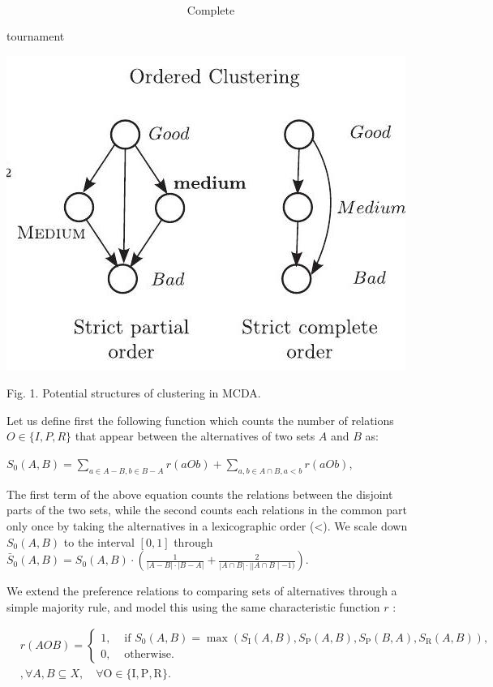 \documentclass[10pt]{article}
\begin{document}
$$
\text { Complete }
$$

tournament

\begin{center}
\includegraphics[max width=\textwidth]{2024_01_11_fda3c6ffd32dd805faacg-3}
\end{center}

Fig. 1. Potential structures of clustering in MCDA.

Let us define first the following function which counts the number of relations $O \in\{I, P, R\}$ that appear between the alternatives of two sets $A$ and $B$ as:

$S_{0}(A, B)=\sum_{a \in A-B, b \in B-A} r(a O b)+\sum_{a, b \in A \cap B, a<b} r(a O b)$,

The first term of the above equation counts the relations between the disjoint parts of the two sets, while the second counts each relations in the common part only once by taking the alternatives in a lexicographic order (<). We scale down $S_{0}(A, B)$ to the interval $[0,1]$ through $\bar{S}_{0}(A, B)=S_{0}(A, B) \cdot\left(\frac{1}{|A-B| \cdot|B-A|}+\frac{2}{|A \cap B| \cdot|| A \cap B \mid-1)}\right)$.

We extend the preference relations to comparing sets of alternatives through a simple majority rule, and model this using the same characteristic function $r$ :

$$
\begin{aligned}
& r(A O B)= \begin{cases}1, & \text { if } S_{0}(A, B)=\max \left(S_{\mathrm{I}}(A, B), S_{\mathrm{P}}(A, B), S_{\mathrm{P}}(B, A), S_{\mathrm{R}}(A, B)\right), \\
0, & \text { otherwise. }\end{cases} \\
& , \forall A, B \subseteq X, \quad \forall \mathrm{O} \in\{\mathrm{I}, \mathrm{P}, \mathrm{R}\} .
\end{aligned}
$$
\end{document}

